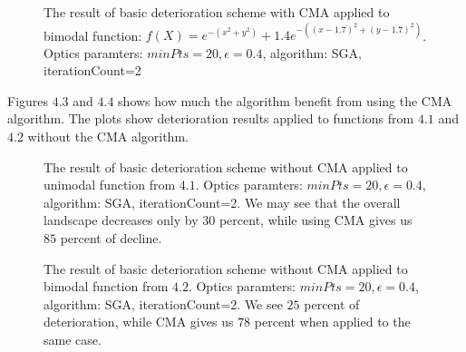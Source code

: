 \begin{figure}
  \centering
  \caption{The result of basic deterioration scheme with CMA 
  applied to bimodal function: $f(X) = e^{-(x^2 + y^2)}+1.4e^{-((x-1.7)^2 +
  (y-1.7)^2)}$. Optics paramters: $minPts=20, \epsilon=0.4$, algorithm: SGA, iterationCount=2}
  \label{det2}
\end{figure}

Figures $4.3$ and $4.4$ shows how much the algorithm benefit from using
the CMA algorithm. The plots show deterioration results applied to
functions from $4.1$ and $4.2$ without the CMA algorithm.

\begin{figure}
  \centering
  \caption{The result of basic deterioration scheme without CMA 
  applied to unimodal function from $4.1$. Optics paramters: $minPts=20,
  \epsilon=0.4$, algorithm: SGA, iterationCount=2. We may see that the 
  overall landscape decreases only by $30$ percent, while using CMA
  gives us $85$ percent of decline.}
  \label{det3}
\end{figure}

\begin{figure}
  \centering
  \caption{The result of basic deterioration scheme without CMA 
  applied to bimodal function from $4.2$. Optics paramters: $minPts=20,
  \epsilon=0.4$, algorithm: SGA, iterationCount=2. We see $25$ percent
  of deterioration, while CMA gives us $78$ percent when applied to the same
  case.}
  \label{det3}
\end{figure}

